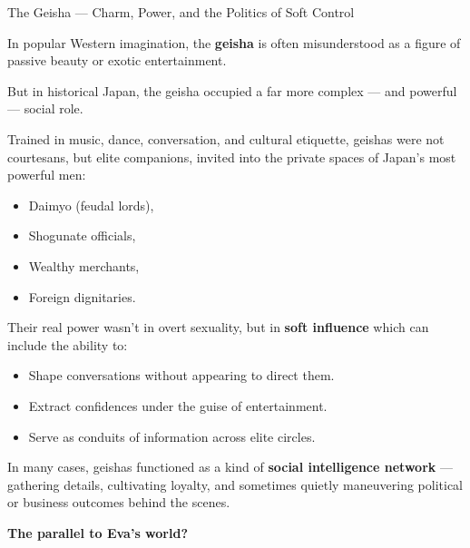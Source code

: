 \begin{HistoricalSidebar}{The Geisha --- Charm, Power, and the Politics of Soft Control}

    In popular Western imagination, the \textbf{geisha} is often misunderstood as a figure of passive beauty or exotic entertainment.  

    \medskip

    But in historical Japan, the geisha occupied a far more complex — and powerful — social role.
    
    \medskip
    
    Trained in music, dance, conversation, and cultural etiquette, geishas were not courtesans, but elite companions, invited into the private spaces of Japan’s most powerful men:  

    \medskip

    \begin{itemize}
        \item Daimyo (feudal lords),
        \item Shogunate officials,
        \item Wealthy merchants,
        \item Foreign dignitaries.
    \end{itemize}
    
    \medskip
    
    Their real power wasn’t in overt sexuality, but in \textbf{soft influence} which can include the ability to:

    \medskip

    \begin{itemize}
        \item Shape conversations without appearing to direct them.
        \item Extract confidences under the guise of entertainment.
        \item Serve as conduits of information across elite circles.
    \end{itemize}
    
    \medskip
    
    In many cases, geishas functioned as a kind of \textbf{social intelligence network} —  
    gathering details, cultivating loyalty, and sometimes quietly maneuvering political or business outcomes behind the scenes.
    
    \medskip
    
    \textbf{The parallel to Eva’s world?}

    \medskip
    

\end{HistoricalSidebar}
